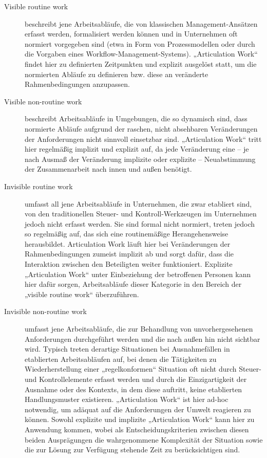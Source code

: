 \begin{description}
	\item[Visible routine work] beschreibt jene Arbeitsabläufe, die von klassischen Management-Ansätzen erfasst werden, formalisiert werden können und in Unternehmen oft normiert vorgegeben sind (etwa in Form von Prozessmodellen oder durch die Vorgaben eines Workflow-Management-Systems). „Articulation Work“ findet hier zu definierten Zeitpunkten und explizit ausgelöst statt, um die normierten Abläufe zu definieren bzw. diese an veränderte Rahmenbedingungen anzupassen. 
	\item[Visible non-routine work] beschreibt Arbeitsabläufe in Umgebungen, die so dynamisch sind, dass normierte Abläufe aufgrund der raschen, nicht absehbaren Veränderungen der Anforderungen nicht sinnvoll einsetzbar sind. „Articulation Work“ tritt hier regelmäßig implizit und explizit auf, da jede Veränderung eine -- je nach Ausmaß der Veränderung implizite oder explizite -- Neuabstimmung der Zusammenarbeit nach innen und außen benötigt.
	\item[Invisible routine work] umfasst all jene Arbeitsabläufe in Unternehmen, die zwar etabliert sind, von den traditionellen Steuer- und Kontroll-Werkzeugen im Unternehmen jedoch nicht erfasst werden. Sie sind formal nicht normiert, treten jedoch so regelmäßig auf, das sich eine routinemäßige Herangehensweise herausbildet. Articulation Work läuft hier bei Veränderungen der Rahmenbedingungen zumeist implizit ab und sorgt dafür, dass die Interaktion zwischen den Beteiligten weiter funktioniert. Explizite „Articulation Work“ unter Einbeziehung der betroffenen Personen kann hier dafür sorgen, Arbeitsabläufe dieser Kategorie in den Bereich der „visible routine work“ überzuführen.
	\item[Invisible non-routine work] umfasst jene Arbeitsabläufe, die zur Behandlung von unvorhergesehenen Anforderungen durchgeführt werden und die nach außen hin nicht sichtbar wird. Typisch treten derartige Situationen bei Ausnahmefällen in etablierten Arbeitsabläufen auf, bei denen die Tätigkeiten zu Wiederherstellung einer „regelkonformen“ Situation oft nicht durch Steuer- und Kontrollelemente erfasst werden und durch die Einzigartigkeit der Ausnahme oder des Kontexts, in dem diese auftritt, keine etablierten Handlungsmuster existieren. „Articulation Work“ ist hier ad-hoc notwendig, um adäquat auf die Anforderungen der Umwelt reagieren zu können. Sowohl explizite und implizite „Articulation Work“ kann hier zu Anwendung kommen, wobei als Entscheidungskriterien zwischen diesen beiden Ausprägungen die wahrgenommene Komplexität der Situation sowie die zur Lösung zur Verfügung stehende Zeit zu berücksichtigen sind.
\end{description}

